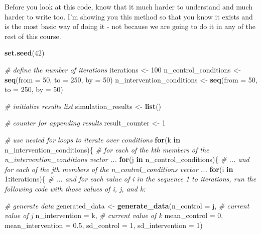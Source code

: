 \documentclass[
]{article}
\newenvironment{Shaded}{\begin{snugshade}}{\end{snugshade}}
\newcommand{\AttributeTok}[1]{\textcolor[rgb]{0.13,0.29,0.53}{#1}}
\newcommand{\CommentTok}[1]{\textcolor[rgb]{0.56,0.35,0.01}{\textit{#1}}}
\newcommand{\ControlFlowTok}[1]{\textcolor[rgb]{0.13,0.29,0.53}{\textbf{#1}}}
\newcommand{\DecValTok}[1]{\textcolor[rgb]{0.00,0.00,0.81}{#1}}
\newcommand{\FloatTok}[1]{\textcolor[rgb]{0.00,0.00,0.81}{#1}}
\newcommand{\FunctionTok}[1]{\textcolor[rgb]{0.13,0.29,0.53}{\textbf{#1}}}
\newcommand{\NormalTok}[1]{#1}
\newcommand{\OtherTok}[1]{\textcolor[rgb]{0.56,0.35,0.01}{#1}}
\newcommand{\SpecialCharTok}[1]{\textcolor[rgb]{0.81,0.36,0.00}{\textbf{#1}}}
\begin{document}
Before you look at this code, know that it much harder to understand and
much harder to write too. I'm showing you this method so that you know
it exists and is the most basic way of doing it - not because we are
going to do it in any of the rest of this course.

\begin{Shaded}
\begin{Highlighting}[]
\FunctionTok{set.seed}\NormalTok{(}\DecValTok{42}\NormalTok{)}

\CommentTok{\# define the number of iterations}
\NormalTok{iterations }\OtherTok{\textless{}{-}} \DecValTok{100}
\NormalTok{n\_control\_conditions }\OtherTok{\textless{}{-}} \FunctionTok{seq}\NormalTok{(}\AttributeTok{from =} \DecValTok{50}\NormalTok{, }\AttributeTok{to =} \DecValTok{250}\NormalTok{, }\AttributeTok{by =} \DecValTok{50}\NormalTok{)}
\NormalTok{n\_intervention\_conditions }\OtherTok{\textless{}{-}} \FunctionTok{seq}\NormalTok{(}\AttributeTok{from =} \DecValTok{50}\NormalTok{, }\AttributeTok{to =} \DecValTok{250}\NormalTok{, }\AttributeTok{by =} \DecValTok{50}\NormalTok{)}

\CommentTok{\# initialize results list}
\NormalTok{simulation\_results }\OtherTok{\textless{}{-}} \FunctionTok{list}\NormalTok{()}

\CommentTok{\# counter for appending results}
\NormalTok{result\_counter }\OtherTok{\textless{}{-}} \DecValTok{1}

\CommentTok{\# use nested for loops to iterate over conditions}
\ControlFlowTok{for}\NormalTok{(k }\ControlFlowTok{in}\NormalTok{ n\_intervention\_conditions)\{ }\CommentTok{\# for each of the \textquotesingle{}k\textquotesingle{}{-}th members of the n\_intervention\_conditions vector ... }
  \ControlFlowTok{for}\NormalTok{(j }\ControlFlowTok{in}\NormalTok{ n\_control\_conditions)\{ }\CommentTok{\# ... and for each of the \textquotesingle{}j\textquotesingle{}{-}th members of the n\_control\_conditions vector ...}
    \ControlFlowTok{for}\NormalTok{(i }\ControlFlowTok{in} \DecValTok{1}\SpecialCharTok{:}\NormalTok{iterations)\{ }\CommentTok{\# ... and for each value of \textquotesingle{}i\textquotesingle{} in the sequence 1 to iterations, run the following code with those values of i, j, and k:}
      
      \CommentTok{\# generate data}
\NormalTok{      generated\_data }\OtherTok{\textless{}{-}} \FunctionTok{generate\_data}\NormalTok{(}\AttributeTok{n\_control =}\NormalTok{ j,  }\CommentTok{\# current value of j}
                                      \AttributeTok{n\_intervention =}\NormalTok{ k,  }\CommentTok{\# current value of k}
                                      \AttributeTok{mean\_control =} \DecValTok{0}\NormalTok{,}
                                      \AttributeTok{mean\_intervention =} \FloatTok{0.5}\NormalTok{,}
                                      \AttributeTok{sd\_control =} \DecValTok{1}\NormalTok{,}
                                      \AttributeTok{sd\_intervention =} \DecValTok{1}\NormalTok{)}
      

\end{Highlighting}
\end{Shaded}
\end{document}
